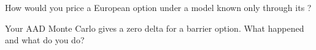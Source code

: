 \begin{interviewq}\label{iq:qm:transforms-interpolation-and-algorithmic-differentiation:5}
How would you price a European option under a model known only through its ?
\end{interviewq}

\begin{interviewq}\label{iq:qm:transforms-interpolation-and-algorithmic-differentiation:6}
Your AAD Monte Carlo gives a zero delta for a barrier option. What happened and what do you do?
\end{interviewq}
